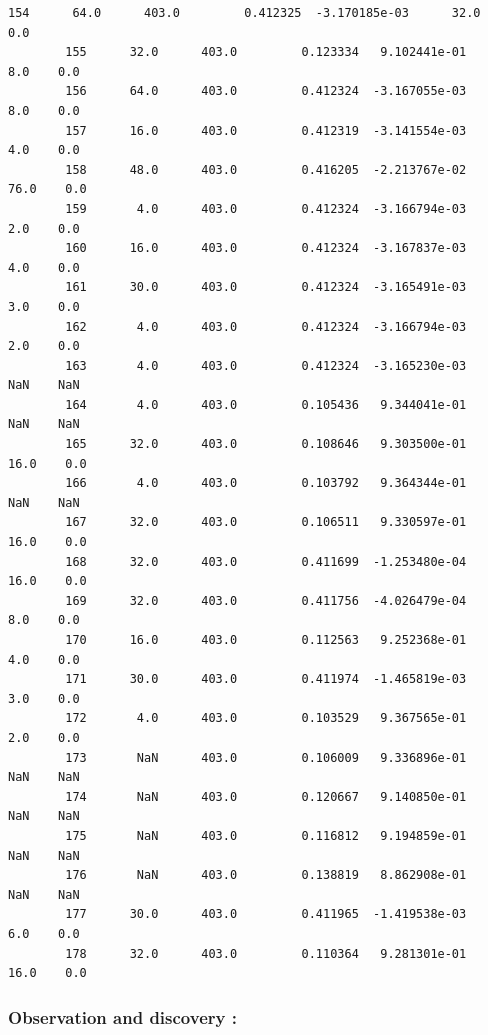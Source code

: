 \documentclass[11pt, a4paper , landscape]{article}
\begin{document}
\begin{Verbatim}[commandchars=\\\{\}]
        154      64.0      403.0         0.412325  -3.170185e-03      32.0    0.0  
        155      32.0      403.0         0.123334   9.102441e-01       8.0    0.0  
        156      64.0      403.0         0.412324  -3.167055e-03       8.0    0.0  
        157      16.0      403.0         0.412319  -3.141554e-03       4.0    0.0  
        158      48.0      403.0         0.416205  -2.213767e-02      76.0    0.0  
        159       4.0      403.0         0.412324  -3.166794e-03       2.0    0.0  
        160      16.0      403.0         0.412324  -3.167837e-03       4.0    0.0  
        161      30.0      403.0         0.412324  -3.165491e-03       3.0    0.0  
        162       4.0      403.0         0.412324  -3.166794e-03       2.0    0.0  
        163       4.0      403.0         0.412324  -3.165230e-03       NaN    NaN  
        164       4.0      403.0         0.105436   9.344041e-01       NaN    NaN  
        165      32.0      403.0         0.108646   9.303500e-01      16.0    0.0  
        166       4.0      403.0         0.103792   9.364344e-01       NaN    NaN  
        167      32.0      403.0         0.106511   9.330597e-01      16.0    0.0  
        168      32.0      403.0         0.411699  -1.253480e-04      16.0    0.0  
        169      32.0      403.0         0.411756  -4.026479e-04       8.0    0.0  
        170      16.0      403.0         0.112563   9.252368e-01       4.0    0.0  
        171      30.0      403.0         0.411974  -1.465819e-03       3.0    0.0  
        172       4.0      403.0         0.103529   9.367565e-01       2.0    0.0  
        173       NaN      403.0         0.106009   9.336896e-01       NaN    NaN  
        174       NaN      403.0         0.120667   9.140850e-01       NaN    NaN  
        175       NaN      403.0         0.116812   9.194859e-01       NaN    NaN  
        176       NaN      403.0         0.138819   8.862908e-01       NaN    NaN  
        177      30.0      403.0         0.411965  -1.419538e-03       6.0    0.0  
        178      32.0      403.0         0.110364   9.281301e-01      16.0    0.0  
\end{Verbatim}
            
    \subsubsection{Observation and discovery
:}\label{observation-and-discovery}
\end{document}
